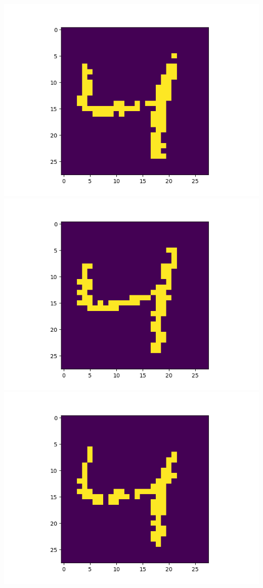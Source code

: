 \includegraphics[scale=0.2]{./bilder/comparison/prob/10}
\includegraphics[scale=0.2]{./bilder/comparison/prob/11}
\includegraphics[scale=0.2]{./bilder/comparison/prob/12}
